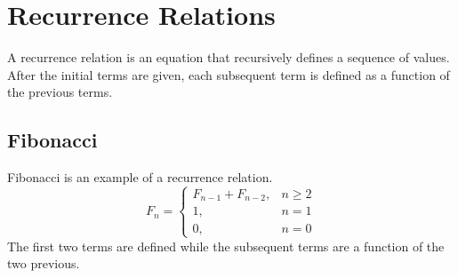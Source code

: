 \section{Recurrence Relations}
A recurrence relation is an equation that recursively defines a sequence of values. After the initial terms are given, each subsequent term is defined as a function of the previous terms.

\subsection{Fibonacci}
Fibonacci is an example of a recurrence relation.
$$
F_n = \begin{cases}
	F_{n-1} + F_{n-2}, &  n \geq 2\\
	1, & n = 1\\
	0, & n = 0
\end{cases}
$$
The first two terms are defined while the subsequent terms are a function of the two previous.




